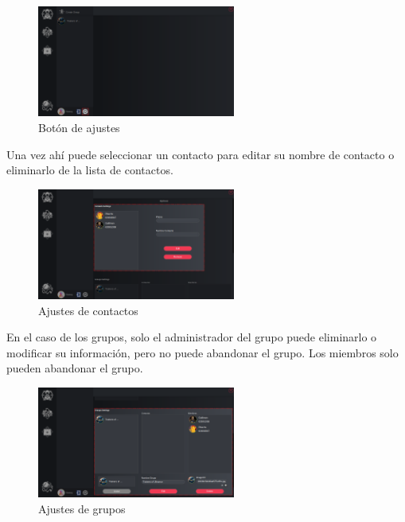 \begin{figure}[H]
    \centering
    \includegraphics[width=0.58\textwidth]{images/manualDeUsuario/EditarContactos&Grupos1.png}
    \caption*{Botón de ajustes}
\end{figure}

Una vez ahí puede seleccionar un contacto para editar su nombre de contacto o eliminarlo de la lista de contactos.

\begin{figure}[H]
    \centering
    \includegraphics[width=0.58\textwidth]{images/manualDeUsuario/EditarContactos&Grupos2.png}
    \caption*{Ajustes de contactos}
\end{figure}

En el caso de los grupos, solo el administrador del grupo puede eliminarlo o modificar su información, pero no puede abandonar el grupo. 
Los miembros solo pueden abandonar el grupo.

\begin{figure}[H]
    \centering
    \includegraphics[width=0.58\textwidth]{images/manualDeUsuario/EditarContactos&Grupos3.png}
    \caption*{Ajustes de grupos}
\end{figure}

